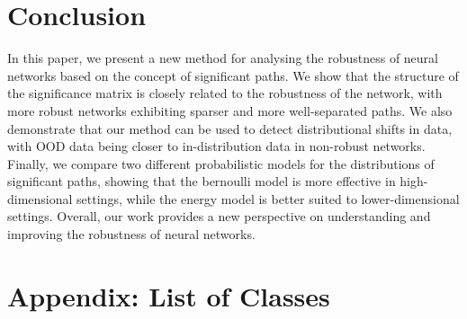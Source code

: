\documentclass{article}
\begin{document}

    \section{Conclusion}
        In this paper, we present a new method for analysing the robustness of neural networks based on the concept of significant paths. We show that the structure of the significance matrix is closely related to the robustness of the network, with more robust networks exhibiting sparser and more well-separated paths. We also demonstrate that our method can be used to detect distributional shifts in data, with OOD data being closer to in-distribution data in non-robust networks. Finally, we compare two different probabilistic models for the distributions of significant paths, showing that the bernoulli model is more effective in high-dimensional settings, while the energy model is better suited to lower-dimensional settings. Overall, our work provides a new perspective on understanding and improving the robustness of neural networks.

    
    

    \appendix
    \section{Appendix: List of Classes}
\end{document}
